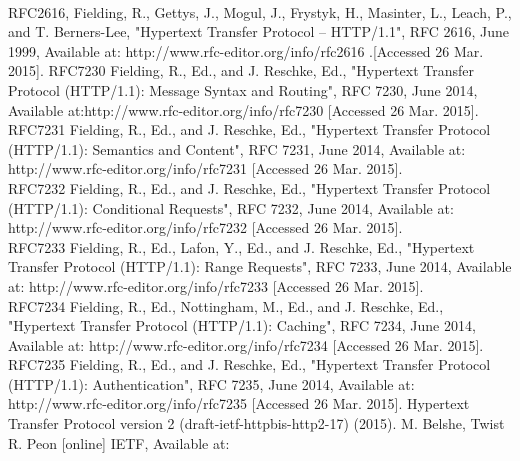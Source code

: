 \documentclass{article}
\begin{document}
\newpage

\newpage


\newpage

\newpage



\newpage




\newpage

\newpage

\newpage
\begin{thebibliography}
\\
RFC2616, Fielding, R., Gettys, J., Mogul, J., Frystyk, H., Masinter, L., Leach, P., and T. Berners-Lee, "Hypertext Transfer Protocol -- HTTP/1.1", RFC 2616, June 1999, Available at: http://www.rfc-editor.org/info/rfc2616 .[Accessed 26 Mar. 2015].
RFC7230 Fielding, R., Ed., and J. Reschke, Ed., "Hypertext Transfer Protocol (HTTP/1.1): Message Syntax and Routing", RFC 7230, June 2014, Available at:http://www.rfc-editor.org/info/rfc7230  [Accessed 26 Mar. 2015]. \\
RFC7231 Fielding, R., Ed., and J. Reschke, Ed., "Hypertext Transfer Protocol (HTTP/1.1): Semantics and Content", RFC 7231, June 2014, Available at: http://www.rfc-editor.org/info/rfc7231 [Accessed 26 Mar. 2015]. \\
RFC7232 Fielding, R., Ed., and J. Reschke, Ed., "Hypertext Transfer Protocol (HTTP/1.1): Conditional Requests", RFC 7232, June 2014, Available at: http://www.rfc-editor.org/info/rfc7232 [Accessed 26 Mar. 2015]. \\ 
RFC7233 Fielding, R., Ed., Lafon, Y., Ed., and J. Reschke, Ed., "Hypertext Transfer Protocol (HTTP/1.1): Range Requests", RFC 7233, June 2014, Available at: http://www.rfc-editor.org/info/rfc7233 [Accessed 26 Mar. 2015]. \\
RFC7234 Fielding, R., Ed., Nottingham, M., Ed., and J. Reschke, Ed., "Hypertext Transfer Protocol (HTTP/1.1): Caching", RFC 7234, June 2014, Available at: http://www.rfc-editor.org/info/rfc7234 [Accessed 26 Mar. 2015]. \\
RFC7235 Fielding, R., Ed., and J. Reschke, Ed., "Hypertext Transfer Protocol (HTTP/1.1): Authentication", RFC 7235, June 2014, Available at: http://www.rfc-editor.org/info/rfc7235 [Accessed 26 Mar. 2015].
Hypertext Transfer Protocol version 2 (draft-ietf-httpbis-http2-17) (2015). M. Belshe, Twist R. Peon [online] IETF, Available at:

\end{thebibliography}
\end{document}
